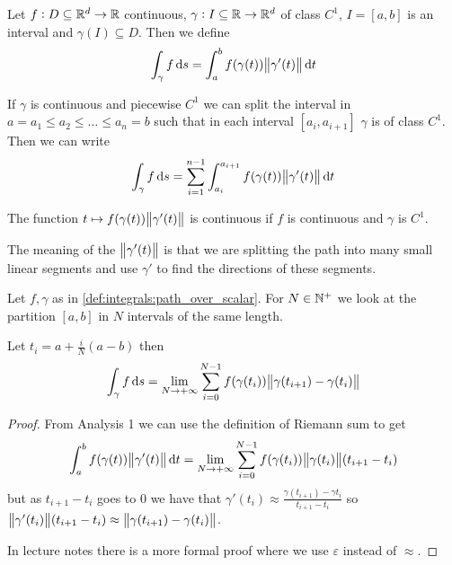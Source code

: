 \documentclass[12pt]{extarticle}
\begin{document}
\begin{definition}
    \label{def:integrals:path_over_scalar}
    Let $f: D \subseteq \mathbb{R}^d \to \mathbb{R}$ continuous, $\gamma: I \subseteq \mathbb{R} \to \mathbb{R}^d$ of class $C^1$, $I = [a, b]$ is an interval and $\gamma(I) \subseteq D$.
    Then we define
    \begin{equation}
        \int_\gamma f \dd{s} = \int_a^b f(\gamma(t)) \norm{\gamma'(t)} \dd{t}
    \end{equation}

    If $\gamma$ is continuous and piecewise $C^1$ we can split the interval in $a = a_1 \leq a_2 \leq \dots \leq a_n = b$ such that in each interval $[a_i, a_{i+1}]$ $\gamma$ is of class $C^1$.
    Then we can write
    \begin{equation}
        \int_{\gamma} f \dd{s} = \sum^{n -1}_{i = 1} \int^{a_{i+1}}_{a_i} f(\gamma(t)) \norm{\gamma'(t)} \dd{t}
    \end{equation}
\end{definition}

\begin{remark}
    The function $t \mapsto f(\gamma(t)) \norm{\gamma'(t)}$ is continuous if $f$ is continuous and $\gamma$ is $C^1$.
\end{remark}

The meaning of the $\norm{\gamma'(t)}$ is that we are splitting the path into many small linear segments and use $\gamma'$ to find the directions of these segments.

\begin{proposition}
    Let $f, \gamma$ as in \autoref{def:integrals:path_over_scalar}.
    For $N \in \mathbb{N}^+$ we look at the partition $[a, b]$ in $N$ intervals of the same length.

    Let $t_i = a + \frac{i}{N}(a-b)$
    then
    \begin{equation}
        \int_\gamma f \dd{s} = \lim_{N \to +\infty} \sum_{i = 0}^{N-1} f(\gamma(t_i)) \norm{\gamma(t_{i+1}) - \gamma(t_i)}
    \end{equation}
\end{proposition}

\begin{proof}
    From Analysis 1 we can use the definition of Riemann sum to get
    \begin{equation}
        \int_a^b f(\gamma(t)) \norm{\gamma'(t)} \dd{t} = \lim_{N \to +\infty} \sum_{i = 0}^{N-1} f(\gamma(t_i)) \norm{\gamma(t_i)} (t_{i+1} - t_i)
    \end{equation}
    but as $t_{i+1} - t_{i}$ goes to $0$ we have that $\gamma'(t_i) \approx \frac{\gamma(t_{i+1}) - \gamma{t_i}}{t_{i+1} - t_i}$ so
    $\norm{\gamma'(t_i)} (t_{i+1} - t_i) \approx \norm{\gamma(t_{i+1}) - \gamma(t_i)}$.

    In lecture notes there is a more formal proof where we use $\varepsilon$ instead of $\approx$.
\end{proof}
\end{document}
